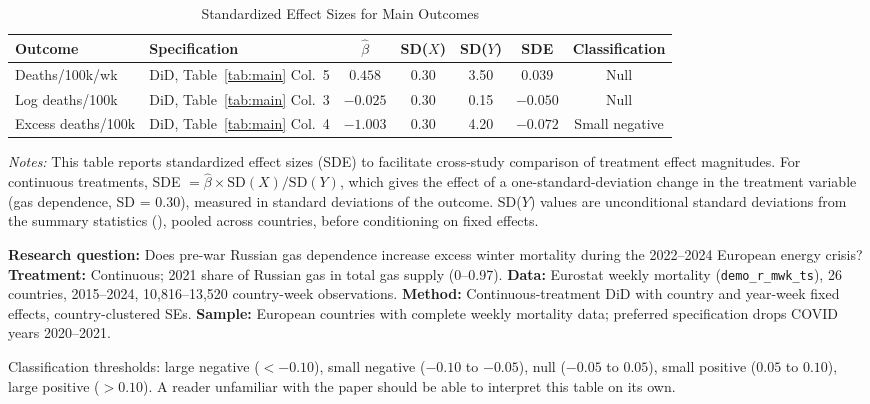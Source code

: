 \documentclass[12pt]{article}
\begin{document}
\begin{table}[H]
\centering
\caption{Standardized Effect Sizes for Main Outcomes}
\label{tab:sde}
\begin{adjustbox}{max width=\textwidth}
\begin{tabular}{llccccc}
\toprule
Outcome & Specification & $\hat{\beta}$ & SD($X$) & SD($Y$) & SDE & Classification \\
\midrule
Deaths/100k/wk & DiD, Table~\ref{tab:main} Col.\ 5 & $0.458$ & 0.30 & 3.50 & $0.039$ & Null \\
Log deaths/100k & DiD, Table~\ref{tab:main} Col.\ 3 & $-0.025$ & 0.30 & 0.15 & $-0.050$ & Null \\
Excess deaths/100k & DiD, Table~\ref{tab:main} Col.\ 4 & $-1.003$ & 0.30 & 4.20 & $-0.072$ & Small negative \\
\bottomrule
\end{tabular}
\end{adjustbox}
\par\vspace{0.3em}
{\footnotesize \emph{Notes:} This table reports standardized effect sizes (SDE)
to facilitate cross-study comparison of treatment effect magnitudes.
For continuous treatments, SDE $= \hat{\beta} \times \text{SD}(X) / \text{SD}(Y)$,
which gives the effect of a one-standard-deviation change in the treatment variable
(gas dependence, SD = 0.30),
measured in standard deviations of the outcome.
SD($Y$) values are unconditional standard deviations from the summary
statistics (), pooled across countries, before conditioning on fixed effects.

\textbf{Research question:} Does pre-war Russian gas dependence increase excess winter mortality during the 2022--2024 European energy crisis?
\textbf{Treatment:} Continuous; 2021 share of Russian gas in total gas supply (0--0.97).
\textbf{Data:} Eurostat weekly mortality (\texttt{demo\_r\_mwk\_ts}), 26 countries, 2015--2024, 10,816--13,520 country-week observations.
\textbf{Method:} Continuous-treatment DiD with country and year-week fixed effects, country-clustered SEs.
\textbf{Sample:} European countries with complete weekly mortality data; preferred specification drops COVID years 2020--2021.

Classification thresholds:
large negative ($< -0.10$), small negative ($-0.10$ to $-0.05$),
null ($-0.05$ to $0.05$), small positive ($0.05$ to $0.10$),
large positive ($> 0.10$).
A reader unfamiliar with the paper should be able to interpret this table
on its own.}
\end{table}
\end{document}
